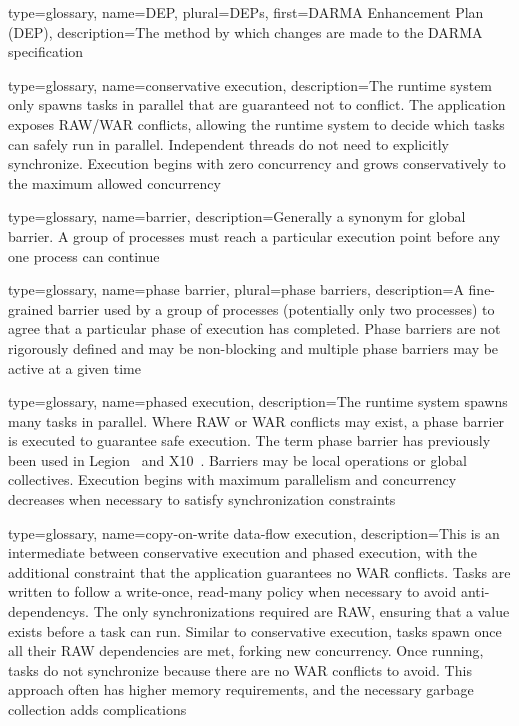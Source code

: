 {
  type=glossary,
  name={DEP},
  plural={DEPs},
  first={\gls{DARMA} Enhancement Plan (DEP)},
  description={The method by which changes are made to the \gls{DARMA}
    specification}
}


{
  type=glossary,
  name={conservative execution},
  description={The \gls{runtime system} only spawns tasks in parallel that are guaranteed not to conflict.  
The application exposes \gls{RAW}/\gls{WAR} conflicts, allowing the
  \gls{runtime system} to decide which tasks can safely 
run in parallel.  Independent threads do not need to explicitly synchronize.
Execution begins with zero \gls{concurrency}
and grows conservatively to the maximum allowed \gls{concurrency}}
}

{
  type=glossary,
  name={barrier},
  description={Generally a synonym for global barrier. A group of processes must reach a particular execution point
  before any one process can continue}
}

{
  type=glossary,
  name={phase barrier},
  plural={phase barriers},
  description={A fine-grained barrier used by a group of processes (potentially only two processes)
    to agree that a particular phase of execution has completed. Phase barriers are not rigorously defined and
    may be non-blocking and multiple phase barriers may be active at a given time}
}

{
  type=glossary,
  name={phased execution},
  description={The \gls{runtime system} spawns many tasks in parallel.  Where
    \gls{RAW} or \gls{WAR} conflicts may 
  exist, a \gls{phase barrier} is executed to guarantee safe execution. The
  term \gls{phase barrier} has previously 
  been used in Legion~\cite{LegionThesis} and X10~\cite{X10Phasers}. Barriers may be local operations 
  or global collectives.  Execution begins with maximum parallelism and
  \gls{concurrency} decreases when 
  necessary to satisfy synchronization constraints}
}

{
  type=glossary,
  name={copy-on-write data-flow execution},
  description={This is an intermediate between \gls{conservative execution} and
    \gls{phased execution}, with the additional constraint that the application guarantees no 
    \gls{WAR} conflicts.  Tasks are written to follow a
    write-once, read-many policy when necessary to avoid \glspl{anti-dependency}.
    The only synchronizations required are \gls{RAW}, ensuring that a
    value exists before a task can run.  Similar to \gls{conservative
      execution},
    tasks spawn once all their \gls{RAW} dependencies are met, forking new
      \gls{concurrency}.  
    Once running, tasks do not synchronize because there are no \gls{WAR} conflicts
    to avoid.  This approach often has higher memory requirements, and the
    necessary garbage collection adds complications}
}

